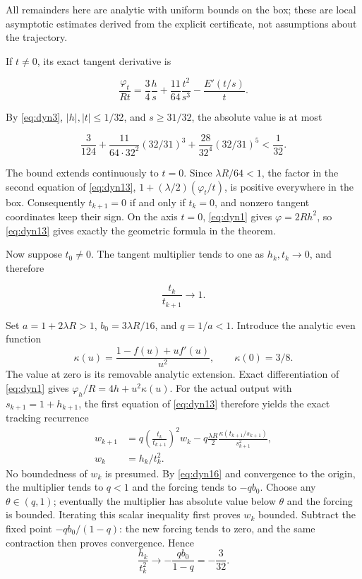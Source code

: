 \documentclass[11pt]{article}
\theoremstyle{remark}\newtheorem{remark}[theorem]{Remark}
\begin{document}
All remainders here are analytic with uniform bounds on the box; these are local asymptotic estimates derived from the explicit certificate, not assumptions about the trajectory.

If \(t\ne0\), its exact tangent derivative is

\[
\frac{\varphi_t}{Rt}=\frac34\frac h{s}
+\frac{11}{64}\frac{t^2}{s^3}-\frac{E'(t/s)}t.
\]

By \eqref{eq:dyn3}, \(|h|,|t|\le1/32\), and \(s\ge31/32\), the absolute value is at most

\begin{equation}
\frac3{124}+\frac{11}{64\cdot32^2}(32/31)^3
+\frac{28}{32^4}(32/31)^5<\frac1{32}. \label{eq:dyn15}
\end{equation}

The bound extends continuously to \(t=0\). Since \(\lambda R/64<1\), the factor in the second equation of \eqref{eq:dyn13},
\(1+(\lambda/2)(\varphi_t/t)\), is positive everywhere in the box. Consequently \(t_{k+1}=0\) if and only if \(t_k=0\), and nonzero tangent coordinates keep their sign. On the axis \(t=0\), \eqref{eq:dyn1} gives \(\varphi=2Rh^2\), so \eqref{eq:dyn13} gives exactly the geometric formula in the theorem.

Now suppose \(t_0\ne0\). The tangent multiplier tends to one as \(h_k,t_k\to0\), and therefore

\begin{equation}
\frac{t_k}{t_{k+1}}\longrightarrow1. \label{eq:dyn16}
\end{equation}

Set \(a=1+2\lambda R>1\), \(b_0=3\lambda R/16\), and \(q=1/a<1\). Introduce the analytic even function
\[
\kappa(u)=\frac{1-f(u)+u f'(u)}{u^2},\qquad \kappa(0)=3/8.
\]
The value at zero is its removable analytic extension. Exact differentiation
of \eqref{eq:dyn1} gives \(\varphi_h/R=4h+u^2\kappa(u)\).
For the actual output with \(s_{k+1}=1+h_{k+1}\), the first equation of
\eqref{eq:dyn13} therefore yields the exact tracking recurrence
\begin{equation}
\begin{aligned}
w_{k+1}&=q\left(\frac{t_k}{t_{k+1}}\right)^2w_k
-q\frac{\lambda R}{2}\frac{\kappa(t_{k+1}/s_{k+1})}{s_{k+1}^2},\\
w_k&=h_k/t_k^2.
\end{aligned}
\label{eq:dyn17}
\end{equation}
No boundedness of \(w_k\) is presumed. By \eqref{eq:dyn16} and convergence
to the origin, the multiplier tends to \(q<1\) and the forcing tends to
\(-qb_0\). Choose any \(\theta\in(q,1)\); eventually the multiplier has
absolute value below \(\theta\) and the forcing is bounded. Iterating this
scalar inequality first proves \(w_k\) bounded. Subtract the fixed point
\(-qb_0/(1-q)\): the new forcing tends to zero, and the same contraction
then proves convergence. Hence
\begin{equation}
\frac{h_k}{t_k^2}\to-\frac{qb_0}{1-q}=-\frac3{32}.
\label{eq:dyn18}
\end{equation}
\end{document}
